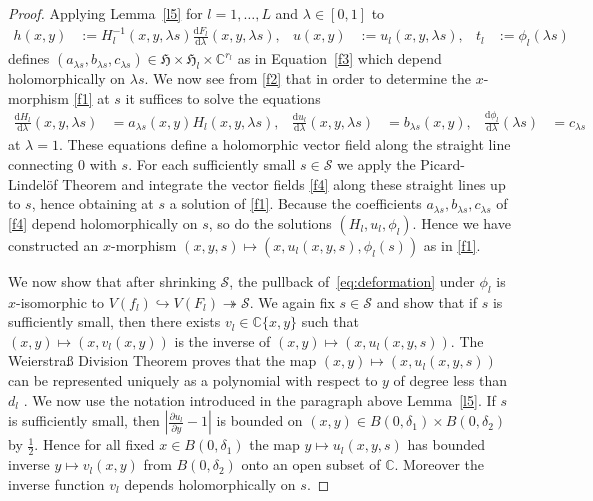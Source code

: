 \documentclass[11pt,twoside]{amsart}
\theoremstyle{plain}
\newcommand{\Sm}{\mathcal{S}}
\begin{document}
\begin{proof}
Applying Lemma~\ref{l5} for $l=1,\ldots, L$ and $\lambda \in [0,1]$ to
\begin{align*}
h(x,y)&:=H_l^{-1}(x,y,\lambda s)\frac{\mathrm{d} F_l}{\mathrm{d}\lambda}(x,y,\lambda s),&
u(x,y)&:=u_l(x,y,\lambda s),&t_l&:=\phi_{l}(\lambda s) 
\end{align*}
defines $(a_{\lambda s},b_{\lambda s},c_{\lambda s}) \in \mathfrak{H} \times \mathfrak{H}_l \times \mathbb{C}^{r_l}$ as in Equation~\eqref{f3} which depend holomorphically on $\lambda s$. We now see from \eqref{f2} that in order to determine the $x$-morphism \eqref{f1} at $s$ it suffices to solve the equations
\begin{align}\label{f4}
\frac{\mathrm{d} H_l}{\mathrm{d} \lambda}(x,y, \lambda s)&=a_{\lambda s}(x,y)H_l(x,y,\lambda s),&
\frac{\mathrm{d} u_l}{\mathrm{d} \lambda}(x,y,\lambda s)&=b_{\lambda s}(x,y),&
\frac{\mathrm{d} \phi_l}{\mathrm{d} \lambda}(\lambda s)&=c_{\lambda s}
\end{align}
at $\lambda=1$.
These equations define a holomorphic vector field along the straight line connecting $0$ with $s$. For each sufficiently small $s\in\Sm$ we apply the Picard-Lindel\"of Theorem and integrate the vector fields \eqref{f4} along these straight lines up to $s$, hence obtaining at $s$ a solution of \eqref{f1}. Because the coefficients $a_{\lambda s}, b_{\lambda s}, c_{\lambda s}$ of \eqref{f4} depend holomorphically on $s$, so do the solutions $(H_l, u_l, \phi_l)$. Hence we have constructed an $x$-morphism $(x,y,s)\mapsto(x,u_l(x,y,s), \phi_l(s))$ as in \eqref{f1}. 

We now show that after shrinking $\Sm$, the pullback of~\eqref{eq:deformation} under $\phi_l$ is $x$-isomorphic to $V(f_l)\hookrightarrow V(F_l)\twoheadrightarrow\Sm$.
We again fix $s \in \mathcal{S}$ and show that if 
$s$ is sufficiently small, then there exists 
$v_l \in\mathbb{C}\{x,y\}$ such that 
$(x,y)\mapsto(x,v_l(x,y))$ is the inverse of $(x,y)\mapsto(x,u_l(x,y,s))$. 
The Weierstra{\ss} Division Theorem \cite[Chapter I Theorem 1.1]{PR:94} proves that the map $(x,y)\mapsto(x,u_l(x,y,s))$ can be represented uniquely as a polynomial with respect to $y$ of degree less than $ d_l $ . We now use the notation introduced in the paragraph above Lemma~\ref{l5}. If $s$ is sufficiently small, then $|\frac{\partial u_l}{\partial y}-1|$ is bounded on $(x,y)\in B(0,\delta_1)\times B(0,\delta_2)$ by $\frac{1}{2}$. Hence for all fixed $x\in B(0,\delta_1)$ the map $y\mapsto u_l(x,y,s)$ has bounded inverse $y\mapsto v_l(x,y)$ from $B(0,\delta_2)$ onto an open subset of $\mathbb{C}$. Moreover the inverse function $v_l$ depends holomorphically on $s$.


\end{proof}
\end{document}
